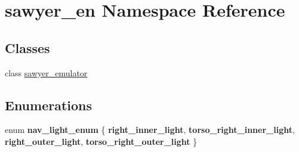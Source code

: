 \hypertarget{namespacesawyer__en}{\section{sawyer\-\_\-en Namespace Reference}
\label{namespacesawyer__en}
}
\subsection*{Classes}
\begin{DoxyCompactItemize}
\item 
class \hyperlink{classsawyer__en_1_1sawyer__emulator}{sawyer\-\_\-emulator}
\end{DoxyCompactItemize}
\subsection*{Enumerations}
\begin{DoxyCompactItemize}
\item 
enum {\bfseries nav\-\_\-light\-\_\-enum} \{ {\bfseries right\-\_\-inner\-\_\-light}, 
{\bfseries torso\-\_\-right\-\_\-inner\-\_\-light}, 
{\bfseries right\-\_\-outer\-\_\-light}, 
{\bfseries torso\-\_\-right\-\_\-outer\-\_\-light}
 \}
\end{DoxyCompactItemize}
